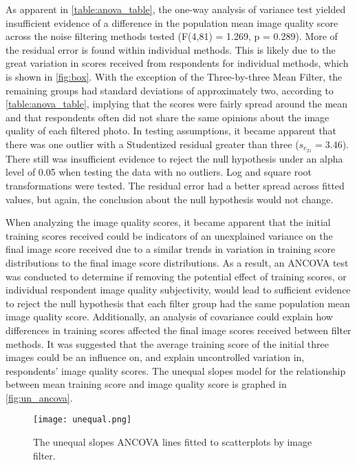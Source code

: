 \documentclass{ncjms}
\begin{document}
As apparent in \autoref{table:anova_table}, the one-way analysis of variance test yielded insufficient evidence of a difference in the population mean image quality score across the noise filtering methods tested (F(4,81) = 1.269, p = 0.289). More of the residual error is found within individual methods. This is likely due to the great variation in scores received from respondents for individual methods, which is shown in \autoref{fig:box}. With the exception of the Three-by-three Mean Filter, the remaining groups had standard deviations of approximately two, according to \autoref{table:anova_table}, implying that the scores were fairly spread around the mean and that respondents often did not share the same opinions about the image quality of each filtered photo. In testing assumptions, it became apparent that there was one outlier with a Studentized residual greater than three ($s_{e_{21}} = 3.46$). There still was insufficient evidence to reject the null hypothesis under an alpha level of 0.05 when testing the data with no outliers. Log and square root transformations were tested. The residual error had a better spread across fitted values, but again, the conclusion about the null hypothesis would not change.

When analyzing the image quality scores, it became apparent that the initial training scores received could be indicators of an unexplained variance on the final image score received due to a similar trends in variation in training score distributions to the final image score distributions. As a result, an ANCOVA test was conducted to determine if removing the potential effect of training scores, or individual respondent image quality subjectivity, would lead to sufficient evidence to reject the null hypothesis that each filter group had the same population mean image quality score. Additionally, an analysis of covariance could explain how differences in training scores affected the final image scores received between filter methods. It was suggested that the average training score of the initial three images could be an influence on, and explain uncontrolled variation in, respondents' image quality scores. The unequal slopes model for the relationship between mean training score and image quality score is graphed in \autoref{fig:un_ancova}.


\begin{figure}[h]
  \centering
    \texttt{[image: unequal.png]}
  \caption{The unequal slopes ANCOVA lines fitted to scatterplots by image filter.}
  \label{fig:un_ancova}
\end{figure}
\end{document}
